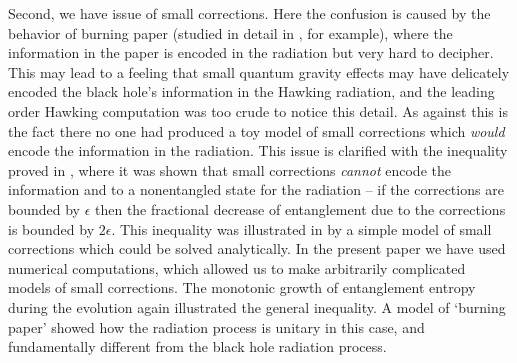 \documentclass[11pt]{article}
\begin{document}
Second, we have issue of small corrections. Here the confusion is caused by the behavior of burning paper (studied in detail in \cite{page}, for example), where the information in the paper is encoded in the radiation but very hard to decipher. This may lead to a feeling that small quantum gravity effects may have delicately encoded the black hole's information in the Hawking radiation, and the leading order Hawking computation was too crude to notice this detail. As against this is the fact there no one had produced a toy model of small corrections which {\it would} encode the information in the radiation. This issue is clarified with the inequality proved in \cite{mathurfuzz}, where it was shown that small corrections {\it cannot} encode the information and  to a nonentangled state for the radiation -- if the corrections are bounded by $\epsilon$ then the fractional decrease of entanglement due to the corrections is bounded by $2\epsilon$. This inequality was illustrated in  \cite{mathurrecent} by a simple model of small corrections which could be solved analytically. In the present paper we have used numerical computations, which allowed us to make arbitrarily  complicated models of small corrections. The monotonic growth of entanglement entropy during the evolution again illustrated the general inequality. A model of `burning paper' showed how the radiation process is unitary in this case, and fundamentally  different from the black hole radiation process. 
\end{document}

